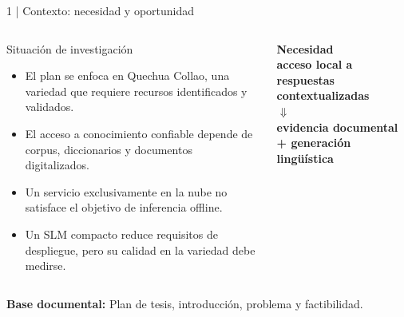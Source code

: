 \documentclass[aspectratio=169,10pt,spanish]{beamer}
\newcommand{\fuente}[1]{\vfill{\tiny\color{bpNavy!75}\textbf{Base documental:} #1}}
\begin{document}
\begin{frame}{1 | Contexto: necesidad y oportunidad}
\begin{columns}[T,onlytextwidth]
\begin{block}{Situación de investigación}
\begin{itemize}\small
  \item El plan se enfoca en Quechua Collao, una variedad que requiere recursos identificados y validados.
  \item El acceso a conocimiento confiable depende de corpus, diccionarios y documentos digitalizados.
  \item Un servicio exclusivamente en la nube no satisface el objetivo de inferencia offline.
  \item Un SLM compacto reduce requisitos de despliegue, pero su calidad en la variedad debe medirse.
\end{itemize}
\end{block}
\begin{tcolorbox}[colback=bpNavy,colframe=bpNavy,arc=2mm]
\centering\color{white}\large\bfseries
Necesidad\\[2mm]
\color{white}\normalsize acceso local a respuestas contextualizadas\\[4mm]
\color{bpGold}\Large$\Downarrow$\\[2mm]
\color{white}\normalsize evidencia documental + generación lingüística
\end{tcolorbox}
\end{columns}
\fuente{Plan de tesis, introducción, problema y factibilidad.}
\end{frame}
\end{document}
